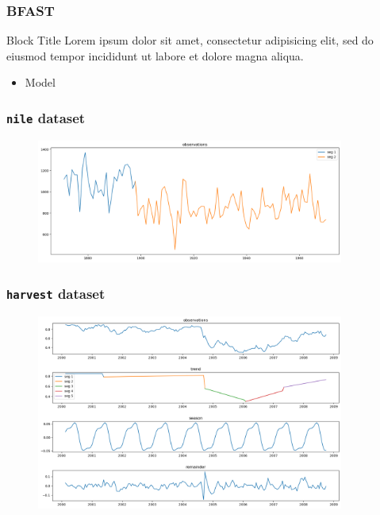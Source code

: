 \documentclass[9pt]{beamer}
\begin{document}
\begin{frame}
\frametitle{BFAST}
\begin{block}{Block Title}
Lorem ipsum dolor sit amet, consectetur adipisicing elit, 
sed do eiusmod tempor incididunt ut labore et 
dolore magna aliqua.
\end{block}
\begin{itemize}
  \item Model
\end{itemize}
\end{frame}

\begin{frame}
\frametitle{\texttt{nile} dataset}
\begin{figure}[H]
  \centering
  \includegraphics[width=0.9\textwidth]{imgs/nile.png}
\end{figure}
\end{frame}

\begin{frame}
\frametitle{\texttt{harvest} dataset}
\begin{figure}[H]
  \centering
  \includegraphics[width=0.9\textwidth]{imgs/harvest.png}
\end{figure}
\end{frame}
\end{document}

